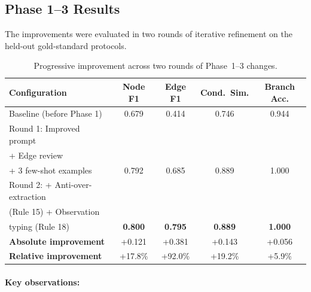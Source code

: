 \documentclass[12pt,a4paper]{article}
\begin{document}
\subsection{Phase 1--3 Results}
\label{sec:phase1-3-results}

The improvements were evaluated in two rounds of iterative refinement on the held-out gold-standard protocols.

\begin{table}[H]
\centering
\caption{Progressive improvement across two rounds of Phase~1--3 changes.}
\label{tab:phase1-3-results}
\begin{tabular}{l c c c c}
\toprule
\textbf{Configuration} & \textbf{Node F1} & \textbf{Edge F1} & \textbf{Cond.\ Sim.} & \textbf{Branch Acc.} \\
\midrule
Baseline (before Phase 1)     & 0.679 & 0.414 & 0.746 & 0.944 \\
\addlinespace
Round 1: Improved prompt       &        &       &       & \\
\quad + Edge review            &        &       &       & \\
\quad + 3 few-shot examples    & 0.792  & 0.685 & 0.889 & 1.000 \\
\addlinespace
Round 2: + Anti-over-extraction &        &       &       & \\
\quad (Rule 15) + Observation   &        &       &       & \\
\quad typing (Rule 18)         & \textbf{0.800}  & \textbf{0.795} & \textbf{0.889} & \textbf{1.000} \\
\midrule
\textbf{Absolute improvement}  & +0.121 & +0.381 & +0.143 & +0.056 \\
\textbf{Relative improvement}  & +17.8\% & +92.0\% & +19.2\% & +5.9\% \\
\bottomrule
\end{tabular}
\end{table}

\paragraph{Key observations:}
\end{document}
